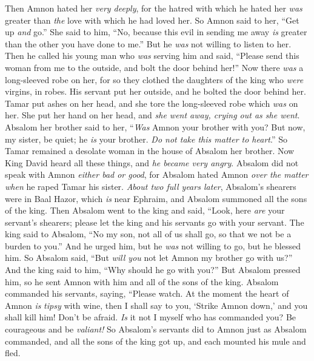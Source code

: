 \begin{biblechapter}
\verse Then Amnon hated her \textit{very deeply}, for the hatred with which he hated her \textit{was} greater than \textit{the} love with which he had loved her. So Amnon said to her, “Get up \textit{and} go.”
\verse She said to him, “No, because this evil in sending me away \textit{is} greater than the other you have done to me.” But he \textit{was} not willing to listen to her.
\verse Then he called his young man who \textit{was} serving him and said, “Please send this woman from me to the outside, and bolt the door behind her!”
\verse Now there \textit{was} a long-sleeved robe on her, for so they clothed the daughters of the king who \textit{were} virgins, in robes. His servant put her outside, and he bolted the door behind her.
\verse Tamar put ashes on her head, and she tore the long-sleeved robe which \textit{was} on her. She put her hand on her head, and \textit{she went away, crying out as she went}.
\verse Absalom her brother said to her, “\textit{Was} Amnon your brother with you? But now, my sister, be quiet; he \textit{is} your brother. \textit{Do not take this matter to heart}.” So Tamar remained a desolate woman in the house of Absalom her brother.
 Now King David heard all these things, and \textit{he became very angry}.
\verse Absalom did not speak with Amnon \textit{either bad or good}, for Absalom hated Amnon \textit{over the matter when} he raped Tamar his sister.
\verse \textit{About two full years later}, Absalom’s shearers were in Baal Hazor, which \textit{is} near Ephraim, and Absalom summoned all the sons of the king.
\verse Then Absalom went to the king and said, “Look, here \textit{are} your servant’s shearers; please let the king and his servants go with your servant.
\verse The king said to Absalom, “No my son, not all of us shall go, so that we not be a burden to you.” And he urged him, but he \textit{was} not willing to go, but he blessed him.
\verse So Absalom said, “But \textit{will you} not let Amnon my brother go with us?” And the king said to him, “Why should he go with you?”
\verse But Absalom pressed him, so he sent Amnon with him and all of the sons of the king.
\verse Absalom commanded his servants, saying, “Please watch. At the moment the heart of Amnon \textit{is} \textit{tipsy} with wine, then I shall say to you, ‘Strike Amnon down,’ and you shall kill him! Don’t be afraid. \textit{Is} it not I myself who has commanded you? Be courageous and be \textit{valiant!}
\verse So Absalom’s servants did to Amnon just as Absalom commanded, and all the sons of the king got up, and each mounted his mule and fled.

\end{biblechapter}
